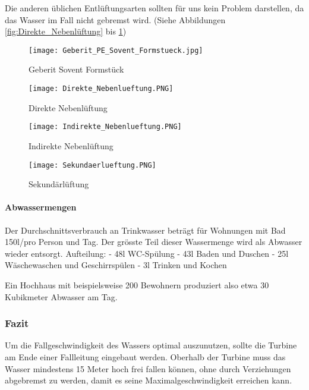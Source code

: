 Die anderen üblichen Entlüftungsarten sollten für uns kein Problem darstellen, da das Wasser im Fall nicht gebremst wird. (Siehe Abbildungen \ref{fig:Direkte_Nebenlüftung} bis \ref{fig:Sekundärlüftung})

\begin{figure}[h]
    \centering
    \begin{minipage}[t]{0.45\linewidth}
    	\centering
    	\texttt{[image: Geberit\_PE\_Sovent\_Formstueck.jpg]}
     	\caption{Geberit Sovent Formstück \cite{geberit}}
		\label{fig:Sovent}
    \end{minipage}
    \;
    \begin{minipage}[t]{0.45\linewidth}
    	\centering
    	\texttt{[image: Direkte\_Nebenlueftung.PNG]}
     	\caption{Direkte Nebenlüftung \cite{docplayer}}
        \label{fig:Direkte_Nebenlüftung}
    \end{minipage}
    \newline
    \begin{minipage}[t]{0.45\linewidth}
    	\centering
    	\texttt{[image: Indirekte\_Nebenlueftung.PNG]}
        \caption{Indirekte Nebenlüftung \cite{docplayer}}
        \label{fig:Indirekte_Nebenlüftung}    
    \end{minipage}
    \;
    \begin{minipage}[t]{0.45\linewidth}
    	\centering
    	\texttt{[image: Sekundaerlueftung.PNG]}
        \caption{Sekundärlüftung \cite{docplayer}}
        \label{fig:Sekundärlüftung}    
    \end{minipage}
\end{figure}

\paragraph{Abwassermengen}
Der Durchschnittsverbrauch an Trinkwasser beträgt für Wohnungen mit Bad 150l/pro Person und Tag. Der grösste Teil dieser Wassermenge wird als Abwasser wieder entsorgt. 
\newline
Aufteilung:
\newline
- 48l \; WC-Spülung
\newline
- 43l \; Baden und Duschen
\newline
- 25l \; Wäschewaschen und Geschirrspülen
\newline
- 3l \;  Trinken und Kochen
\newline
\cite{wohnbau}

Ein Hochhaus mit beispielsweise 200 Bewohnern produziert also etwa 30 Kubikmeter Abwasser am Tag.

\subsubsection{Fazit}
Um die Fallgeschwindigkeit des Wassers optimal auszunutzen, sollte die Turbine am Ende einer Fallleitung eingebaut werden. Oberhalb der Turbine muss das Wasser mindestens 15 Meter hoch frei fallen können, ohne durch Verziehungen abgebremst zu werden, damit es seine Maximalgeschwindigkeit erreichen kann. 


\clearpage 






